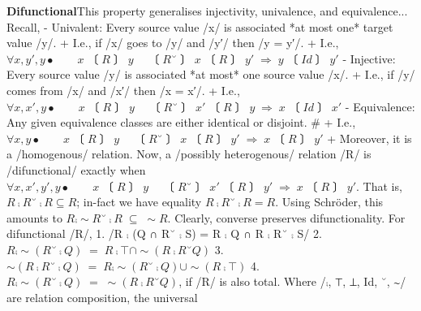 \documentclass[11pt]{article}
\begin{document}
\vspace{1em}\textbf{Difunctional}\quad\label{org-special-block-extras-glossary-Difunctional}This property generalises injectivity, univalence, and equivalence...  Recall, - Univalent: Every source value /x/ is associated *at most one* target value /y/.  \quad  \quad + I.e., if /x/ goes to /y/ and /y′/ then /y = y′/.  \quad  \quad + I.e., $∀ x, y′, y •\quad \quad x 〔R〕 y \quad 〔R˘〕 x 〔R〕 y′ \;⇒\; y 〔Id〕 y′$ - Injective: Every source value /y/ is associated *at most* one source value /x/.  \quad  \quad + I.e., if /y/ comes from /x/ and /x′/ then /x = x′/.  \quad  \quad + I.e., $∀ x, x′, y •\quad \quad x 〔R〕 y \quad 〔R˘〕 x′ 〔R〕 y \;⇒\; x 〔Id〕 x′$ - Equivalence: Any given equivalence classes are either identical or disjoint.  \quad  \quad  \quad # + I.e., $∀ x, y •\quad \quad x 〔R〕 y \quad 〔R˘〕 x 〔R〕 y′ \;⇒\; x 〔R〕 y′$  \quad  \quad + Moreover, it is a /homogenous/ relation.   Now, a /possibly heterogenous/ relation /R/ is /difunctional/ exactly when  $∀ x, x′, y′, y •\quad \quad x 〔R〕 y \quad 〔R˘〕 x′ 〔R〕 y′ \;⇒\; x 〔R〕 y′$.  That is, $R ⨾ R ˘ ⨾ R ⊆ R$; in-fact we have equality $R ⨾ R ˘ ⨾ R = R$.  Using Schröder, this amounts to $R ⨾ ∼R ˘ ⨾ R \;⊆\; ∼R$.   Clearly, converse preserves difunctionality.   For difunctional /R/,  1. /R ⨾ (Q ∩ R˘ ⨾ S) = R ⨾ Q ∩ R ⨾ R˘ ⨾ S/  2. $R ⨾ ∼(R ˘ ⨾ Q) \;=\; R ⨾ ⊤ ∩ ∼(R ⨾ R˘ Q)$  3. $∼(R ⨾ R ˘ ⨾ Q) \;=\; R ⨾ ∼(R˘ ⨾ Q) ∪ ∼(R ⨾ ⊤)$  4. $R ⨾ ∼(R ˘ ⨾ Q) \;=\; ∼(R ⨾ R˘ Q)$, if /R/ is also total.  Where /⨾, ⊤, ⊥, Id, ˘, ∼/ are relation composition, the universal 
\end{document}
